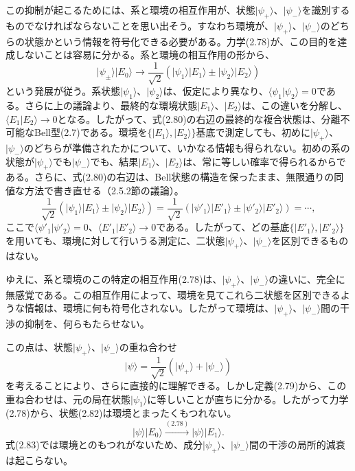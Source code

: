 この抑制が起こるためには、系と環境の相互作用が、状態$\lvert\psi_+\rangle$、$\lvert\psi_-\rangle$を識別するものでなければならないことを思い出そう。すなわち環境が、$\lvert\psi_+\rangle$、$\lvert\psi_-\rangle$のどちらの状態かという情報を符号化できる必要がある。力学(2.78)が、この目的を達成しないことは容易に分かる。系と環境の相互作用の形から、
\begin{equation}\lvert\psi_\pm\rangle\lvert E_0\rangle\longrightarrow\frac1{\sqrt2}(\lvert\psi_1\rangle\lvert E_1\rangle\pm\lvert\psi_2\rangle\lvert E_2\rangle)\tag{2.80}\end{equation}
という発展が従う。系状態$\lvert\psi_1\rangle$、$\lvert\psi_2\rangle$は、仮定により異なり、$\langle\psi_1\vert\psi_2\rangle=0$である。さらに上の議論より、最終的な環境状態$\lvert E_1\rangle$、$\lvert E_2\rangle$は、この違いを分解し、$\langle E_1\vert E_2\rangle\longrightarrow0$となる。したがって、式(2.80)の右辺の最終的な複合状態は、分離不可能なBell型(2.7)である。環境を$\{\lvert E_1\rangle,\lvert E_2\rangle\}$基底で測定しても、初めに$\lvert\psi_+\rangle$、$\lvert\psi_-\rangle$のどちらが準備されたかについて、いかなる情報も得られない。初めの系の状態が$\lvert\psi_+\rangle$でも$\lvert\psi_-\rangle$でも、結果$\lvert E_1\rangle$、$\lvert E_2\rangle$は、常に等しい確率で得られるからである。さらに、式(2.80)の右辺は、Bell状態の構造を保ったまま、無限通りの同値な方法で書き直せる（2.5.2節の議論）。
\begin{equation}\frac1{\sqrt2}(\lvert\psi_1\rangle\lvert E_1\rangle\pm\lvert\psi_2\rangle\lvert E_2\rangle)=\frac1{\sqrt2}(\lvert\psi'_1\rangle\lvert E'_1\rangle\pm\lvert\psi'_2\rangle\lvert E'_2\rangle)=\cdots,\tag{2.81}\end{equation}
ここで$\langle\psi'_1\vert\psi'_2\rangle=0$、$\langle E'_1\vert E'_2\rangle\longrightarrow0$である。したがって、どの基底$\{\lvert E'_1\rangle,\lvert E'_2\rangle\}$を用いても、環境に対して行いうる測定に、二状態$\lvert\psi_+\rangle$、$\lvert\psi_-\rangle$を区別できるものはない。

ゆえに、系と環境のこの特定の相互作用(2.78)は、$\lvert\psi_+\rangle$、$\lvert\psi_-\rangle$の違いに、完全に無感覚である。この相互作用によって、環境を見てこれら二状態を区別できるような情報は、環境に何も符号化されない。したがって環境は、$\lvert\psi_+\rangle$、$\lvert\psi_-\rangle$間の干渉の抑制を、何らもたらせない。

\hypertarget{srcpage:73}{}\label{srcpage:73}
この点は、状態$\lvert\psi_+\rangle$、$\lvert\psi_-\rangle$の重ね合わせ
\begin{equation}\lvert\psi\rangle=\frac1{\sqrt2}(\lvert\psi_+\rangle+\lvert\psi_-\rangle)\tag{2.82}\end{equation}
を考えることにより、さらに直接的に理解できる。しかし定義(2.79)から、この重ね合わせは、元の局在状態$\lvert\psi_1\rangle$に等しいことが直ちに分かる。したがって力学(2.78)から、状態(2.82)は環境とまったくもつれない。
\begin{equation}\lvert\psi\rangle\lvert E_0\rangle\xrightarrow{(2.78)}\lvert\psi\rangle\lvert E_1\rangle.\tag{2.83}\end{equation}
式(2.83)では環境とのもつれがないため、成分$\lvert\psi_+\rangle$、$\lvert\psi_-\rangle$間の干渉の局所的減衰は起こらない。

